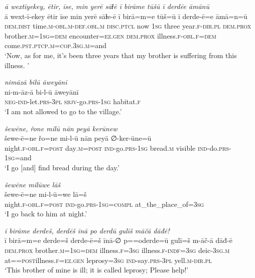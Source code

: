 \ea \label{DG.38}
\textit{ā wextīyekey, ētir, īse, min yerē sāɫē ī birāme tūšū ī derdēe āmānū} \\ 
\gll ā wext-ī-ekey ētir īse min yerē sāɫe-ē ī birā=m=e tūš=ū ī derde-ē=e āmā=n=ū \\ 
 \textsc{dem.dist} time\textsc{.m}\textsc{-obl}\textsc{.m}\textsc{-def}\textsc{.obl}\textsc{.m} \textsc{disc.ptcl} now \textsc{1sg} three year\textsc{\textsc{.f}}\textsc{-dir}\textsc{.pl} \textsc{dem.prox} brother\textsc{.m}\textsc{=1sg}\textsc{=dem} encounter\textsc{=ez}\textsc{.gen} \textsc{dem.prox} illness\textsc{\textsc{.f}}\textsc{-obl}\textsc{\textsc{.f}}\textsc{=dem} come\textsc{.pst}\textsc{.ptcp}\textsc{.m}\textsc{=cop}\textsc{.3sg}\textsc{.m}=and \\ 
\glt `Now, as for me, it’s been three years that my brother is suffering from this illness. '
\z 
 
\ea \label{DG.39}
\textit{nimāzā bilū āweyānī} \\ 
\gll ni-m-āz-ā bi-l-ū āweyānī \\ 
 \textsc{neg-}\textsc{ind-}let\textsc{.prs}\textsc{-3pl} \textsc{sbjv-}go\textsc{.prs}\textsc{-1sg} habitat\textsc{\textsc{.f}} \\ 
\glt `I am not allowed to go to the village.'
\z 
 
\ea \label{DG.40}
\textit{šewēne, řone milū nān peyā kerūnew} \\ 
\gll šewe-ē=ne řo=ne mi-l-ū nān peyā ∅-ker-ūne=ū \\ 
 night\textsc{\textsc{.f}}\textsc{-obl}\textsc{\textsc{.f}}\textsc{=\textsc{post}} day\textsc{.m}\textsc{=\textsc{post}} \textsc{ind-}go\textsc{.prs}\textsc{-1sg} bread\textsc{.m} visible \textsc{ind-}do\textsc{.prs}\textsc{-1sg}=and \\ 
\glt `I go [and] find bread during the day.'
\z 
 
\ea \label{DG.41}
\textit{šewēne milūwe lāš} \\ 
\gll šewe-ē=ne mi-l-ū=we lā=š \\ 
 night\textsc{\textsc{.f}}\textsc{-obl}\textsc{\textsc{.f}}\textsc{=\textsc{post}} \textsc{ind-}go\textsc{.prs}\textsc{-1sg}\textsc{=compl} at\_the\_place\_of\textsc{=3sg} \\ 
\glt `I go back to him at night.'
\z 
 
\ea \label{DG.43}
\textit{ī birāme derdeš, derdēš īnā po derdū gulīš māčā dāđē!} \\ 
\gll ī birā=m=e derde=š derde-ē=š īnā-∅ p==oderde=ū gulī=š m-āč-ā dāđ-ē \\ 
 \textsc{dem.prox} brother\textsc{.m}\textsc{=1sg}\textsc{=dem} illness\textsc{\textsc{.f}}\textsc{=3sg} illness\textsc{\textsc{.f}}\textsc{-indf}\textsc{=3sg} deic\textsc{-3sg}\textsc{.m} at=\textsc{=\textsc{post}}illness\textsc{\textsc{.f}}\textsc{=ez}\textsc{.gen} leprosy\textsc{=3sg} \textsc{ind-}say\textsc{.prs}\textsc{-3pl} yell\textsc{.m}\textsc{-dir}\textsc{.pl} \\ 
\glt `This brother of mine is ill; it is called leprosy; Please help!'
\z 
 
